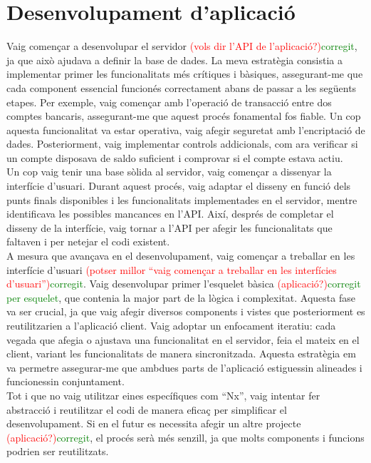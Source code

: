 \documentclass[a4paper,12pt,twoside]{ThesisStyle}
\newcommand{\pau}[1]{\textcolor{red}{#1}}
\newcommand{\sudan}[1]{\textcolor{green}{#1}}
\begin{document}
\section{Desenvolupament d'aplicació}
\label{sec: desenvolupament d'aplicació }

Vaig començar a desenvolupar el servidor \pau{(vols dir l'API de l'aplicació?)}\sudan{corregit}, ja que això ajudava a definir la base de dades. La meva estratègia consistia a implementar primer les funcionalitats més crítiques i bàsiques, assegurant-me que cada component essencial funcionés correctament abans de passar a les següents etapes. Per exemple, vaig començar amb l'operació de transacció entre dos comptes bancaris, assegurant-me que aquest procés fonamental fos fiable. Un cop aquesta funcionalitat va estar operativa, vaig afegir seguretat amb l'encriptació de dades. Posteriorment, vaig implementar controls addicionals, com ara verificar si un compte disposava de saldo suficient i comprovar si el compte estava actiu.\\

Un cop vaig tenir una base sòlida al servidor, vaig començar a dissenyar la interfície d'usuari. Durant aquest procés, vaig adaptar el disseny en funció dels punts finals disponibles i les funcionalitats implementades en el servidor, mentre identificava les possibles mancances en l'API. Així, després de completar el disseny de la interfície, vaig tornar a l'API per afegir les funcionalitats que faltaven i per netejar el codi existent.\\

A mesura que avançava en el desenvolupament, vaig començar a treballar en les interfície d'usuari \pau{(potser millor ``vaig començar a treballar en les interfícies d'usuari'')}\sudan{corregit}. Vaig desenvolupar primer l'esquelet bàsica \pau{(aplicació?)}\sudan{corregit per esquelet}, que contenia la major part de la lògica i complexitat. Aquesta fase va ser crucial, ja que vaig afegir diversos components i vistes que posteriorment es reutilitzarien a l'aplicació client. Vaig adoptar un enfocament iteratiu: cada vegada que afegia o ajustava una funcionalitat en el servidor, feia el mateix en el client, variant les funcionalitats de manera sincronitzada. Aquesta estratègia em va permetre assegurar-me que ambdues parts de l'aplicació estiguessin alineades i funcionessin conjuntament.\\

Tot i que no vaig utilitzar eines específiques com ``Nx'', vaig intentar fer abstracció i reutilitzar el codi de manera eficaç per simplificar el desenvolupament. Si en el futur es necessita afegir un altre projecte \pau{(aplicació?)}\sudan{corregit}, el procés serà més senzill, ja que molts components i funcions podrien ser reutilitzats.
\end{document}
